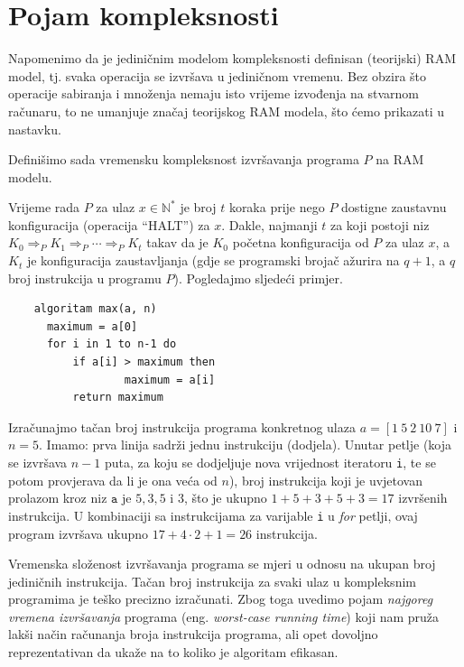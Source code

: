 \section{Pojam kompleksnosti}

Napomenimo da je jediničnim modelom kompleksnosti definisan (teorijski) RAM model, tj. svaka operacija se izvršava u jediničnom vremenu.  Bez obzira što operacije sabiranja i množenja nemaju isto vrijeme izvođenja na stvarnom računaru, to ne umanjuje značaj teorijskog RAM modela, što ćemo prikazati u nastavku.   

Definišimo sada vremensku kompleksnost izvršavanja programa $P$ na RAM modelu.

\begin{definition}
	Vrijeme rada $P$ za ulaz  $x \in \mathbb{N}^*$ je broj $t$ koraka prije nego $P$ dostigne zaustavnu
	konfiguracija (operacija ``HALT'') za $x$. Dakle, najmanji $t$ za koji postoji niz $K_0 \Rightarrow_P  K_1 \Rightarrow_P \cdots \Rightarrow_P K_t$ takav da je $K_0$
	početna konfiguracija od $P$ za ulaz $x$, a $K_t$ je konfiguracija zaustavljanja (gdje se programski brojač  ažurira na $q + 1$, a $q$
	broj instrukcija u programu $P$).  
	Pogledajmo sljedeći primjer. 
	
\end{definition}
 
	
\begin{verbatim}
	algoritam max(a, n)
	  maximum = a[0]
 	  for i in 1 to n-1 do
	      if a[i] > maximum then
                  maximum = a[i]
          return maximum    
\end{verbatim}


Izračunajmo tačan broj instrukcija programa konkretnog ulaza $a = [1\ 5\ 2\ 10\ 7]$ i $n = 5$. Imamo: prva linija sadrži jednu instrukciju (dodjela). Unutar petlje (koja se izvršava $n-1$ puta, za koju se dodjeljuje nova  vrijednost iteratoru \texttt{i}, te se potom provjerava da li je ona veća od $n$), broj instrukcija koji je uvjetovan prolazom kroz niz $\texttt{a}$ je $5, 3, 5$ i $3$, što je ukupno $1+5+3+5+3=17$ izvršenih instrukcija.  U kombinaciji sa instrukcijama za varijable \texttt{i} u \emph{for} petlji, ovaj program izvršava ukupno $17+ 4 \cdot 2 + 1 = 26$ instrukcija.



Vremenska složenost izvršavanja programa se mjeri u odnosu na ukupan broj
jediničnih instrukcija. Tačan broj instrukcija za svaki ulaz u kompleksnim programima je     teško precizno izračunati. Zbog toga uvedimo pojam \textit{najgoreg vremena izvršavanja} programa (eng. \textit{worst-case running time}) koji nam pruža   lakši način računanja broja instrukcija programa, ali opet dovoljno reprezentativan da ukaže na to koliko je algoritam efikasan. 

